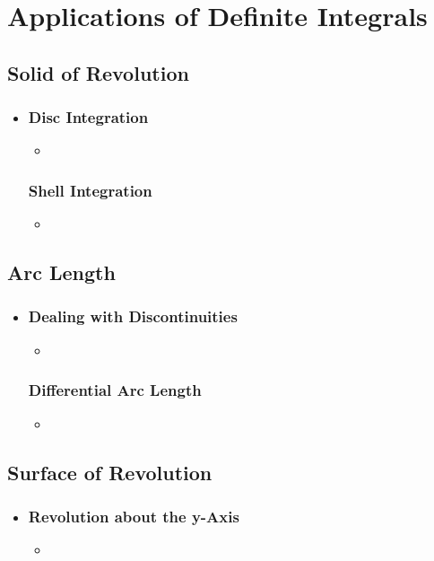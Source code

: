 \chapter{Applications of Definite Integrals}

\section{Solid of Revolution}
\begin{itemize}
  \item []
  
  \subsection{Disc Integration}
  \begin{itemize}
    \item 
  \end{itemize}

  \subsection{Shell Integration}
  \begin{itemize}
    \item 
  \end{itemize}
  
\end{itemize}

\section{Arc Length}
\begin{itemize}
  \item []
  
  \subsection{Dealing with Discontinuities}
  \begin{itemize}
    \item 
  \end{itemize}
  
  \subsection{Differential Arc Length}
  \begin{itemize}
    \item 
  \end{itemize}
  
\end{itemize}

\section{Surface of Revolution}
\begin{itemize}
  \item  []
  
  \subsection{Revolution about the y-Axis}
  \begin{itemize}
    \item 
  \end{itemize}
  
\end{itemize}
